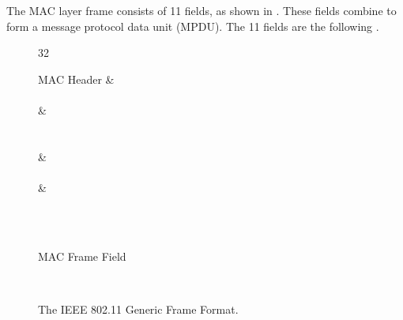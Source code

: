 The MAC layer frame consists of 11 fields, as shown in . These fields combine to form a message protocol data unit (MPDU). The 11 fields are the following \cite{9363693,abdelalim2019study,forouzan2007data,kumar2022design}.

\begin{figure}
	\begin{bytefield}[bitwidth=auto, bitheight=1.15em, bitformatting={\tiny}, boxformatting={\centering\itshape}]{32}
	 \\
	\begin{leftwordgroup}{MAC Header}
	 &	 \\
		\\
	 &  \\
	 \\
		\\
	 &  \\
		\\
	 &  \\
	\end{leftwordgroup} \\
	 \\
	\begin{leftwordgroup}{MAC Frame Field}
	\end{leftwordgroup} \\	
	\end{bytefield}
	\caption{The IEEE 802.11 Generic Frame Format.}
\label{fig:macframe}
\end{figure}

